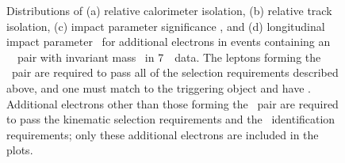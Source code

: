 \begin{figure}[h]
{        }
\caption[ Distributions of relative track and calorimeter isolation, \dzerosig\
and \zzero\ for additional electrons in events containing a dilepton pair with
mass \sstooos\ in 7~\tev\ data.]{Distributions of (a) relative calorimeter isolation, (b)
relative track isolation, (c) impact parameter significance \dzerosig,
and (d) longitudinal impact parameter \zzero\ for additional electrons in events
containing an \ossf\ \dilepton\ pair with
invariant mass \sstooos\ in 7~\tev\ data. The leptons forming the \dilepton\ pair are required to pass all of
the selection requirements described above, and one must match to the triggering
object and have \ptgt{25}. Additional electrons other than those forming the
\dilepton\ pair are required to pass
the kinematic selection requirements and the \loosePP\ identification
requirements; only these additional electrons are included in the plots.}
\label{fig:objsel-el}
\end{figure}


%

